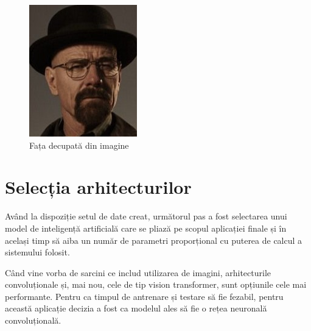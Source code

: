 \begin{figure}[htbp]
\begin{minipage}[b]{0.45\textwidth}
        \includegraphics[width=\textwidth]{images/WW_face.jpg}
        \caption{Fața decupată din imagine}
    \end{minipage}
\end{figure}

\section{Selecția arhitecturilor}

Având la dispoziție setul de date creat, următorul pas a fost selectarea unui model de inteligență artificială care se pliază pe scopul aplicației finale și în același timp să aiba un număr de parametri proporțional cu puterea de calcul a sistemului folosit. 

Când vine vorba de sarcini ce includ utilizarea de imagini, arhitecturile convoluționale și, mai nou, cele de tip vision transformer, sunt opțiunile cele mai performante. Pentru ca timpul de antrenare și testare să fie fezabil, pentru această aplicație decizia a fost ca modelul ales să fie o rețea neuronală convoluțională. 

